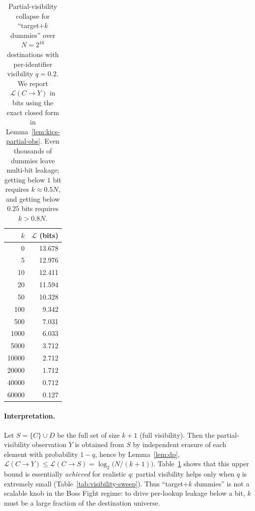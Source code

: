 \documentclass[11pt]{article}
\newcommand{\MaxL}{\mathcal{L}}
\newcommand{\logtwo}{\log_2}
\begin{document}
\begin{table}[t]
\centering
\caption{Partial-visibility collapse for ``target+$k$ dummies'' over $N=2^{16}$ destinations with per-identifier visibility $q=0.2$. We report $\MaxL(C\!\to\!Y)$ in bits using the exact closed form in Lemma~\ref{lem:kics-partial-obs}. Even thousands of dummies leave multi-bit leakage; getting below $1$ bit requires $k\approx 0.5N$, and getting below $0.25$ bits requires $k>0.8N$.}
\label{tab:kics-collapse}
\begin{tabular}{r r}
\toprule
$k$ & $\MaxL$ (bits)\\
\midrule
0 & 13.678\\
5 & 12.976\\
10 & 12.411\\
20 & 11.594\\
50 & 10.328\\
100 & 9.342\\
500 & 7.031\\
1000 & 6.033\\
5000 & 3.712\\
10000 & 2.712\\
20000 & 1.712\\
40000 & 0.712\\
60000 & 0.127\\
\bottomrule
\end{tabular}
\end{table}

\paragraph{Interpretation.}
Let $S=\{C\}\cup D$ be the full set of size $k{+}1$ (full visibility).
Then the partial-visibility observation $Y$ is obtained from $S$ by independent erasure of each element with probability $1-q$, hence by Lemma~\ref{lem:dp},
$\MaxL(C\!\to\!Y)\le \MaxL(C\!\to\!S)=\logtwo\!\big(N/(k{+}1)\big)$.
Table~\ref{tab:kics-collapse} shows that this upper bound is essentially \emph{achieved} for realistic $q$:
partial visibility helps only when $q$ is extremely small (Table~\ref{tab:visibility-sweep}).
Thus ``target+$k$ dummies'' is not a scalable knob in the Boss Fight regime: to drive per-lookup leakage below a bit, $k$ must be a large fraction of the destination universe.
\end{document}
